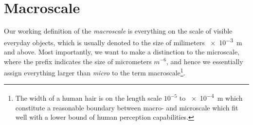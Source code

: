 
















\section{Macroscale}

Our working definition of the \textit{macroscale} is everything on the scale of visible everyday objects, which is usually denoted to the size of milimeters \SI{e-3}{\metre} and above. Most importantly, we want to make a distinction to the microscale, where the prefix indicates the size of micrometers $m^{-6}$, and hence we essentially assign everything larger than \textit{micro} to the term macroscale\footnote{The width of a human hair is on the length scale $10^{-5}$ to \SI{e-4}{m} which constitute a reasonable boundary between macro- and microscale which fit well with a lower bound of human perception capabilities.}.

